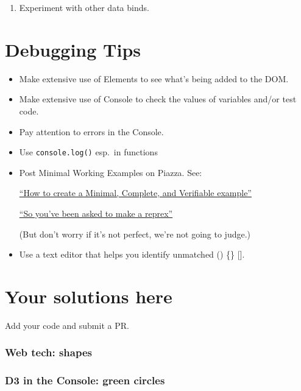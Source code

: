 \documentclass[openany]{book}
\providecommand{\tightlist}{%
  \setlength{\itemsep}{0pt}\setlength{\parskip}{0pt}}
\begin{document}
\begin{enumerate}
\def\labelenumi{\arabic{enumi}.}
\setcounter{enumi}{2}
\tightlist
\item
  Experiment with other data binds.
\end{enumerate}

\hypertarget{debugging-tips}{%
\chapter{Debugging Tips }\label{debugging-tips}}

\begin{itemize}
\item
  Make extensive use of Elements to see what's being added to the DOM.
\item
  Make extensive use of Console to check the values of variables and/or test code.
\item
  Pay attention to errors in the Console.
\item
  Use \texttt{console.log()} esp.~in functions
\item
  Post Minimal Working Examples on Piazza. See:

  \href{https://stackoverflow.com/help/mcve}{``How to create a Minimal, Complete, and Verifiable example''}

  \href{https://www.jessemaegan.com/post/so-you-ve-been-asked-to-make-a-reprex/}{``So you've been asked to make a reprex''}

  (But don't worry if it's not perfect, we're not going to judge.)
\item
  Use a text editor that helps you identify unmatched () \{\} {[}{]}.
\end{itemize}

\hypertarget{your-solutions-here}{%
\chapter{Your solutions here }\label{your-solutions-here}}

Add your code and submit a PR.

\hypertarget{web-tech-shapes}{%
\subsection*{Web tech: shapes}\label{web-tech-shapes}}

\hypertarget{d3-in-the-console-green-circles}{%
\subsection*{D3 in the Console: green circles}\label{d3-in-the-console-green-circles}}
\end{document}
